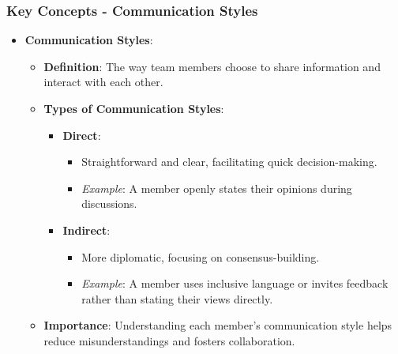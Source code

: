 \documentclass[aspectratio=169]{beamer}
\begin{document}
\begin{frame}[fragile]
    \frametitle{Key Concepts - Communication Styles}
    \begin{itemize}
        \item \textbf{Communication Styles}:
        \begin{itemize}
            \item \textbf{Definition}: The way team members choose to share information and interact with each other.
            \item \textbf{Types of Communication Styles}:
            \begin{itemize}
                \item \textbf{Direct}:
                \begin{itemize}
                    \item Straightforward and clear, facilitating quick decision-making.
                    \item \textit{Example}: A member openly states their opinions during discussions.
                \end{itemize}
                \item \textbf{Indirect}:
                \begin{itemize}
                    \item More diplomatic, focusing on consensus-building.
                    \item \textit{Example}: A member uses inclusive language or invites feedback rather than stating their views directly.
                \end{itemize}
            \end{itemize}
            \item \textbf{Importance}: Understanding each member's communication style helps reduce misunderstandings and fosters collaboration.
        \end{itemize}
    \end{itemize}
\end{frame}
\end{document}
